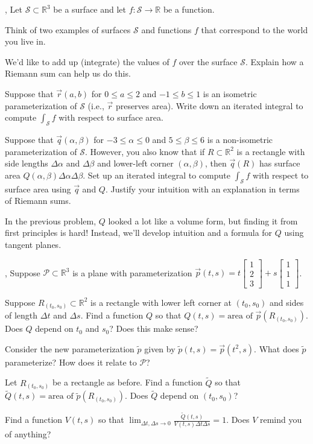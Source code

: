 \documentclass[letter]{article}
\newcommand{\R}{\mathbb{R}}
\newcommand{\mat}[1]{\begin{bmatrix}#1\end{bmatrix}}
\begin{document}
	\sep
	Let $\mathcal S\subset \R^3$ be a surface and let $f:\mathcal S\to \R$ be a function.
	\begin{Enum}
		\item Think of two examples of surfaces $\mathcal S$ and functions $f$ that correspond
			to the world you live in.
		\item We'd like to add up (integrate) the values of $f$ over the surface $\mathcal S$.  Explain
			how a Riemann sum can help us do this.
		\item Suppose that $\vec r(a,b)$ for $0\leq a\leq 2$ and $-1\leq b\leq 1$ is an isometric
			parameterization of $\mathcal S$ (i.e., $\vec r$ preserves area).  Write down
			an iterated integral to compute $\displaystyle \int_{\mathcal S} f$ with respect
			to surface area.
		\item Suppose that $\vec q(\alpha,\beta)$ for $-3\leq \alpha\leq 0$ and $5\leq \beta\leq 6$
			is a non-isometric parameterization of $\mathcal S$.  However,
			you also know that if $R\subset \R^2$ is a rectangle with side lengths $\Delta\alpha$
			and $\Delta\beta$ and lower-left corner $(\alpha,\beta)$, then $\vec q(R)$ has surface area
			$Q(\alpha,\beta)\Delta \alpha\Delta\beta$.  Set up an iterated integral to compute
			$\displaystyle \int_{\mathcal S} f$ with respect
			to surface area using $\vec q$ and $Q$.  Justify your intuition with an explanation in
			terms of Riemann sums.
	\end{Enum}

	In the previous problem, $Q$ looked a lot like a volume form, but finding it from first principles
	is hard!  Instead, we'll develop intuition and a formula for $Q$ using tangent planes.

	\sep
	\vspace{-.3cm}
	Suppose $\mathcal P\subset \R^3$ is a plane with parameterization $\vec p(t,s) = t\mat{1\\2\\3} + s\mat{1\\1\\1}$.
	\begin{Enum}
		\item Suppose $R_{(t_0,s_0)}\subset \R^2$ is a rectangle with lower left corner at $(t_0,s_0)$ and 
			sides of length $\Delta t$ and $\Delta s$.  Find a function $Q$ so that $Q(t,s) =\text{area of }\vec p(R_{(t_0,s_0)})$.
			Does $Q$ depend on $t_0$ and $s_0$?  Does this make sense?
		\item Consider the new parameterization $\tilde p$ given by $\tilde p(t,s) = \vec p(t^2,s)$.  What does
			$\tilde p$ parameterize?  How does it relate to $\mathcal P$?
		\item Let $R_{(t_0,s_0)}$ be a rectangle as before.  Find a function $\tilde Q$ so that
			$\tilde Q(t,s) =\text{area of }\tilde p(R_{(t_0,s_0)})$.  Does $\tilde Q$ depend on
			$(t_0,s_0)$?
		\item Find a function $V(t,s)$ so that $\displaystyle\lim_{\Delta t,\Delta s\to 0} \frac{\tilde Q(t,s)}{V(t,s)\Delta t\Delta s}
			=1$.  Does $V$ remind you of anything?
	\end{Enum}
\end{document}
